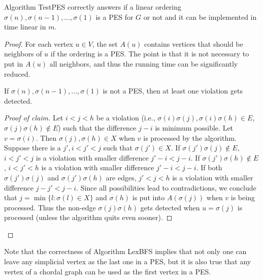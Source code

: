 \begin{thm}
	Algorithm TestPES correctly answers if a linear ordering $\sigma(n), \sigma(n-1), \dots, \sigma(1)$ is a PES for $G$ or not and it can be implemented in time linear in $m$.
\end{thm}

\begin{proof}
	For each vertex $u \in V$, the set $A(u)$ contains vertices that should be neighbors of $u$ if the ordering is a PES. The point is that it is not necessary to put in $A(u)$ all neighbors, and thus the running time can be significantly reduced.
	
	\begin{claim}
		If $\sigma(n), \sigma(n-1), \dots, \sigma(1)$ is not a PES, then at least one violation gets detected.
	\end{claim}
	
	\begin{proof}[Proof of claim]
		Let $i < j < h$ be a violation (i.e., $\sigma(i)\sigma(j), \sigma(i)\sigma(h) \in E$, $\sigma(j)\sigma(h) \notin E$) such that the difference $j - i$ is minimum possible. Let $v = \sigma(i)$. Then $\sigma(j), \sigma(h) \in X$ when $v$ is processed by the algorithm. Suppose there is a $j' , i < j' < j$ such that $\sigma(j') \in X$. If $\sigma(j')\sigma(j) \notin E$, $i < j' < j$ is a violation with smaller difference $j' - i < j - i$. If $\sigma(j')\sigma(h) \notin E$, $i < j' < h$ is a violation with smaller difference $j' - i < j - i$. If both $\sigma(j')\sigma(j)$ and $\sigma(j')\sigma(h)$ are edges, $j' < j < h$ is a violation with smaller difference $j - j' < j - i$. Since all possibilities lead to contradictions, we conclude that $j = \min\{l : \sigma(l) \in X\}$ and $\sigma(h)$ is put into $A(\sigma(j))$ when $v$ is being processed. Thus the non-edge $\sigma(j)\sigma(h)$ gets detected when $u = \sigma(j)$ is processed (unless the algorithm quits even sooner).
	\end{proof}
\end{proof}

\begin{rem}
	Note that the correctness of Algorithm LexBFS implies that not only one can leave any simplicial vertex as the last one in a PES, but it is also true that any vertex of a chordal graph can be used as the first vertex in a PES.
\end{rem}